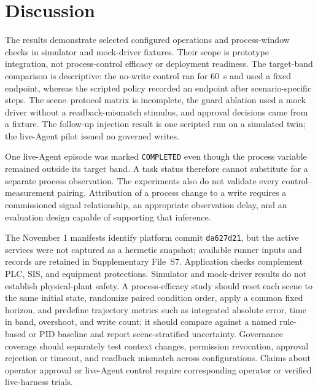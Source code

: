 \section{Discussion}
\label{sec:discussion}
The results demonstrate selected configured operations and process-window checks in simulator and mock-driver fixtures. Their scope is prototype integration, not process-control efficacy or deployment readiness. The target-band comparison is descriptive: the no-write control ran for 60~s and used a fixed endpoint, whereas the scripted policy recorded an endpoint after scenario-specific steps. The scene--protocol matrix is incomplete, the guard ablation used a mock driver without a readback-mismatch stimulus, and approval decisions came from a fixture. The follow-up injection result is one scripted run on a simulated twin; the live-Agent pilot issued no governed writes.

One live-Agent episode was marked \texttt{COMPLETED} even though the process variable remained outside its target band. A task status therefore cannot substitute for a separate process observation. The experiments also do not validate every control--measurement pairing. Attribution of a process change to a write requires a commissioned signal relationship, an appropriate observation delay, and an evaluation design capable of supporting that inference.

The November 1 manifests identify platform commit \texttt{da627d21}, but the active services were not captured as a hermetic snapshot; available runner inputs and records are retained in Supplementary File~S7. Application checks complement PLC, SIS, and equipment protections. Simulator and mock-driver results do not establish physical-plant safety. A process-efficacy study should reset each scene to the same initial state, randomize paired condition order, apply a common fixed horizon, and predefine trajectory metrics such as integrated absolute error, time in band, overshoot, and write count; it should compare against a named rule-based or PID baseline and report scene-stratified uncertainty. Governance coverage should separately test context changes, permission revocation, approval rejection or timeout, and readback mismatch across configurations. Claims about operator approval or live-Agent control require corresponding operator or verified live-harness trials.

